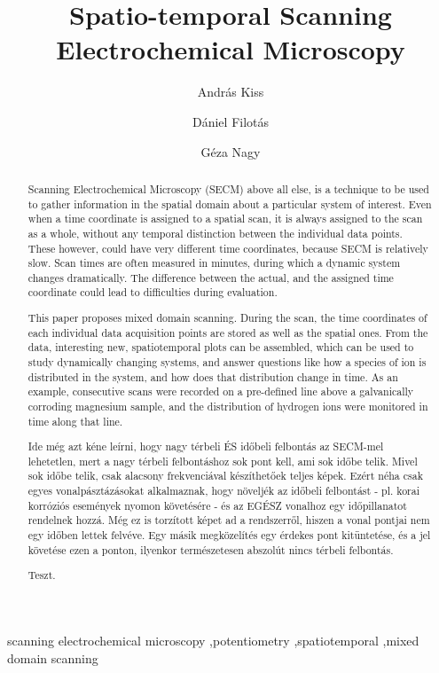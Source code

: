 \documentclass[3p]{elsarticle}
\begin{document}
\begin{frontmatter}

\title{Spatio-temporal Scanning Electrochemical Microscopy}
\author[akiss]{András Kiss}
\address[akiss, gnagy]{Department of General and Physical Chemistry, Faculty of Sciences, University of Pécs, 7624 Pécs, Ifjúság útja 6, Hungary}
\author[dfilotas]{Dániel Filotás}
\author[gnagy]{Géza Nagy}


\begin{abstract}

Scanning Electrochemical Microscopy (SECM) above all else, is a technique to be used to gather information in the spatial domain about a particular system of interest.
Even when a time coordinate is assigned to a spatial scan, it is always assigned to the scan as a whole, without any temporal distinction between the individual data points.
These however, could have very different time coordinates, because SECM is relatively slow.
Scan times are often measured in minutes, during which a dynamic system changes dramatically.
The difference between the actual, and the assigned time coordinate could lead to difficulties during evaluation.
 
This paper proposes mixed domain scanning.
During the scan, the time coordinates of each individual data acquisition points are stored as well as the spatial ones.
From the data, interesting new, spatiotemporal plots can be assembled, which can be used to study dynamically changing systems, and answer questions like how a species of ion is distributed in the system, and how does that distribution change in time.
As an example, consecutive scans were recorded on a pre-defined line above a galvanically corroding magnesium sample, and the distribution of hydrogen ions were monitored in time along that line.

Ide még azt kéne leírni, hogy nagy térbeli ÉS időbeli felbontás az SECM-mel lehetetlen, mert a nagy térbeli felbontáshoz sok pont kell, ami sok időbe telik.
Mivel sok időbe telik, csak alacsony frekvenciával készíthetőek teljes képek.
Ezért néha csak egyes vonalpásztázásokat alkalmaznak, hogy növeljék az időbeli felbontást - pl. korai korróziós események nyomon követésére - és az EGÉSZ vonalhoz egy időpillanatot rendelnek hozzá.
Még ez is torzított képet ad a rendszerről, hiszen a vonal pontjai nem egy időben lettek felvéve.
Egy másik megközelítés egy érdekes pont kitüntetése, és a jel követése ezen a ponton, ilyenkor természetesen abszolút nincs térbeli felbontás.

Teszt.

\end{abstract}
\begin{keyword}
	scanning electrochemical microscopy \sep potentiometry \sep spatiotemporal \sep mixed domain scanning
\end{keyword}
\end{frontmatter}
\end{document}
